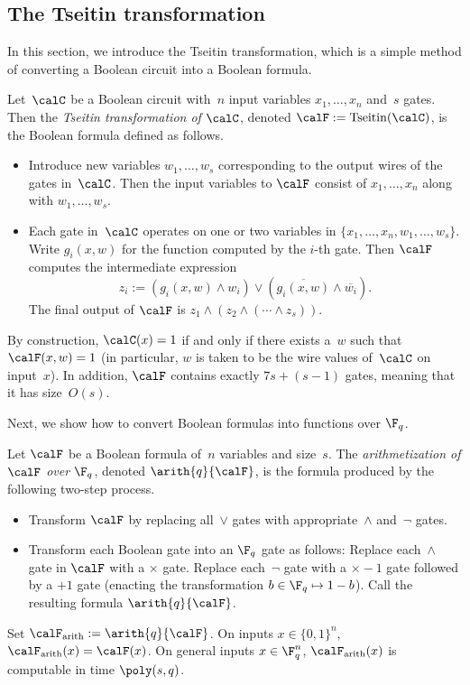 \subsection{The Tseitin transformation}

In this section, we introduce the Tseitin transformation, which is a simple method of converting a Boolean circuit into a Boolean formula.

\begin{definition}
Let~$\calC$ be a Boolean circuit with~$n$ input variables $x_1, \ldots, x_n$ and~$s$ gates.
Then the \emph{Tseitin transformation of $\calC$}, denoted $\calF := \mathrm{Tseitin}(\calC)$, is the Boolean formula defined as follows.
\begin{itemize}
\item[(i)] Introduce new variables $w_1, \ldots, w_s$ corresponding to the output wires of the gates in~$\calC$.
		Then the input variables to $\calF$ consist of  $x_1, \ldots, x_n$ along with $w_1, \ldots, w_s$.
\item[(ii)] Each gate in~$\calC$ operates on one or two variables in $\{x_1, \ldots, x_n, w_1, \ldots, w_s\}$.
		Write $g_i(x, w)$ for the function computed by the $i$-th gate.
		Then $\calF$ computes the intermediate expression
		\begin{equation*}
			z_i := (g_i(x, w) \land w_i) \lor (\overline{g_i(x, w)} \land \overline{w_i}).
		\end{equation*}
		The final output of $\calF$ is $z_1 \land (z_2 \land ( \cdots \land z_s))$.
\end{itemize}
By construction, $\calC(x) = 1$ if and only if there exists a~$w$ such that $\calF(x, w) = 1$
(in particular, $w$ is taken to be the wire values of~$\calC$ on input~$x$).
In addition, $\calF$ contains exactly $7s + (s-1)$ gates, meaning that it has size~$O(s)$.
\end{definition}

Next, we show how to convert Boolean formulas into functions over $\F_q$.

\begin{definition}[Arithmetization]\label{def:arithmetization}
Let $\calF$ be a Boolean formula of~$n$ variables and size~$s$.
The \emph{arithmetization of $\calF$ over $\F_q$}, denoted $\arith{q}{\calF}$, is the formula produced by the following two-step process.
\begin{itemize}
\item[(i)] Transform $\calF$ by replacing all~$\lor$ gates with appropriate~$\land$ and~$\neg$ gates.
\item[(ii)] Transform each Boolean gate into an $\F_q$ gate as follows:
		Replace each~$\land$ gate in $\calF$ with a $\times$ gate.
		Replace each~$\neg$ gate with a $\times -1$ gate followed by a $+1$ gate (enacting the transformation $b \in \F_q \mapsto 1-b$).
		Call the resulting formula $\arith{q}{\calF}$.
\end{itemize}
Set $\calF_{\mathrm{arith}} := \arith{q}{\calF}$.
On inputs $x \in \{0, 1\}^n$, $\calF_{\mathrm{arith}}(x) = \calF(x)$.
On general inputs $x \in \F_q^n$, $\calF_{\mathrm{arith}}(x)$ is computable in time $\poly(s, q)$.
\end{definition}

